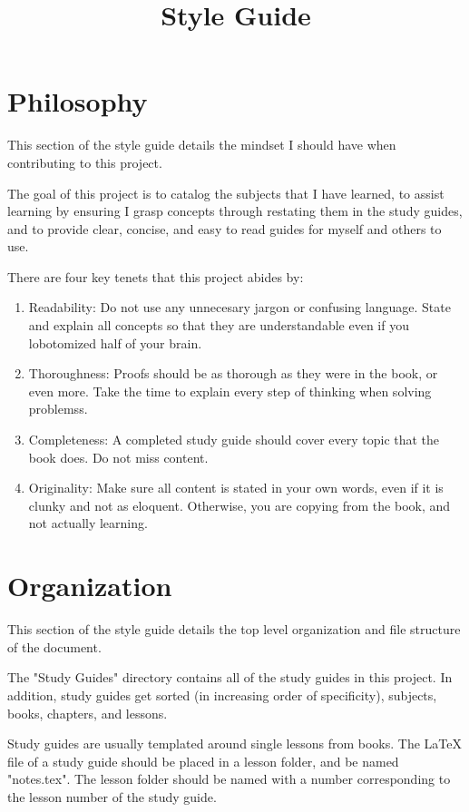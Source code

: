 \documentclass{article}
\title{Style Guide}
\begin{document}
\maketitle

\section{Philosophy}
This section of the style guide details the mindset I should have when contributing to this project.

The goal of this project is to catalog the subjects that I have learned, to assist learning by ensuring I grasp concepts through restating them in the study guides, and to provide clear, concise, and easy to read guides for myself and others to use.

There are four key tenets that this project abides by:

\begin{enumerate}
    \item Readability: Do not use any unnecesary jargon or confusing language. State and explain all concepts so that they are understandable even if you lobotomized half of your brain.
    \item Thoroughness: Proofs should be as thorough as they were in the book, or even more. Take the time to explain every step of thinking when solving problemss.
    \item Completeness: A completed study guide should cover every topic that the book does. Do not miss content.
    \item Originality: Make sure all content is stated in your own words, even if it is clunky and not as eloquent. Otherwise, you are copying from the book, and not actually learning.
\end{enumerate}

\section{Organization}
This section of the style guide details the top level organization and file structure of the document.

The "Study Guides" directory contains all of the study guides in this project. In addition, study guides get sorted (in increasing order of specificity), subjects, books, chapters, and lessons.

Study guides are usually templated around single lessons from books. The LaTeX file of a study guide should be placed in a lesson folder, and be named "notes.tex". The lesson folder should be named with a number corresponding to the lesson number of the study guide.
\end{document}
